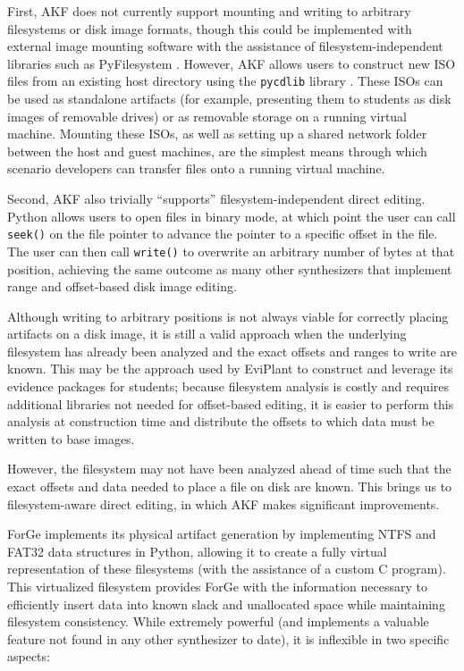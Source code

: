 First, AKF does not currently support mounting and writing to arbitrary
filesystems or disk image formats, though this could be implemented with
external image mounting software with the assistance of
filesystem-independent libraries such as PyFilesystem
\cite{PyFilesystemPyfilesystem22025}. However, AKF allows users to
construct new ISO files from an existing host directory using the
\passthrough{\lstinline!pycdlib!} library
\cite{lalancetteClalancettePycdlib2025}. These ISOs can be used as
standalone artifacts (for example, presenting them to students as disk
images of removable drives) or as removable storage on a running virtual
machine. Mounting these ISOs, as well as setting up a shared network
folder between the host and guest machines, are the simplest means
through which scenario developers can transfer files onto a running
virtual machine.

Second, AKF also trivially ``supports'' filesystem-independent direct
editing. Python allows users to open files in binary mode, at which
point the user can call \passthrough{\lstinline!seek()!} on the file
pointer to advance the pointer to a specific offset in the file. The
user can then call \passthrough{\lstinline!write()!} to overwrite an
arbitrary number of bytes at that position, achieving the same outcome
as many other synthesizers that implement range and offset-based disk
image editing.

Although writing to arbitrary positions is not always viable for
correctly placing artifacts on a disk image, it is still a valid
approach when the underlying filesystem has already been analyzed and
the exact offsets and ranges to write are known. This may be the
approach used by EviPlant \cite{scanlonEviPlantEfficientDigital2017}
to construct and leverage its evidence packages for students; because
filesystem analysis is costly and requires additional libraries not
needed for offset-based editing, it is easier to perform this analysis
at construction time and distribute the offsets to which data must be
written to base images.

However, the filesystem may not have been analyzed ahead of time such
that the exact offsets and data needed to place a file on disk are
known. This brings us to filesystem-aware direct editing, in which AKF
makes significant improvements.

ForGe implements its physical artifact generation by implementing NTFS
and FAT32 data structures in Python, allowing it to create a fully
virtual representation of these filesystems (with the assistance of a
custom C program). This virtualized filesystem provides ForGe with the
information necessary to efficiently insert data into known slack and
unallocated space while maintaining filesystem consistency. While
extremely powerful (and implements a valuable feature not found in any
other synthesizer to date), it is inflexible in two specific aspects:


